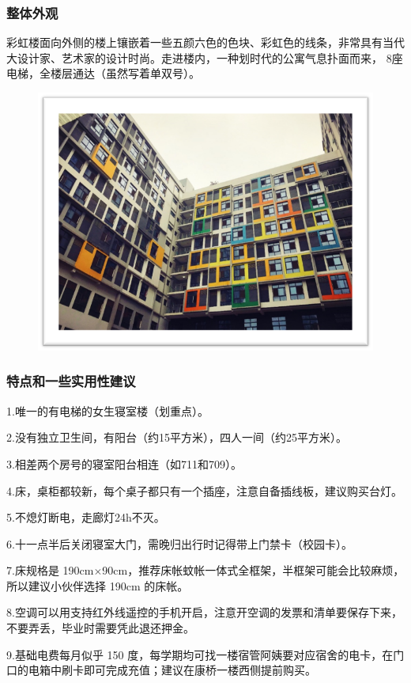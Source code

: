 \documentclass[
decoration,  %
]{qyxf-book}
\begin{document}
	\hypertarget{ux6574ux4f53ux5916ux89c2}{%
		\subsubsection{整体外观}\label{ux6574ux4f53ux5916ux89c2}}
	
	彩虹楼面向外侧的楼上镶嵌着一些五颜六色的色块、彩虹色的线条，非常具有当代大设计家、艺术家的设计时尚。走进楼内，一种划时代的公寓气息扑面而来， 8座电梯，全楼层通达（虽然写着单双号）。
	
	\begin{figure}[htbp]
		\centering
		\includegraphics[width=0.6\linewidth]{pics/chp2_rainbow_outlook}
	\end{figure}
	
	\hypertarget{ux5185ux90e8ux7ed3ux6784}{%
		\subsubsection{特点和一些实用性建议}\label{ux5185ux90e8ux7ed3ux6784}}
	
	1.唯一的有电梯的女生寝室楼（划重点）。
	
	2.没有独立卫生间，有阳台（约15平方米），四人一间（约25平方米）。
	
	3.相差两个房号的寝室阳台相连（如711和709）。
	
	4.床，桌柜都较新，每个桌子都只有一个插座，注意自备插线板，建议购买台灯。
	
	5.不熄灯断电，走廊灯24h不灭。
	
	6.十一点半后关闭寝室大门，需晚归出行时记得带上门禁卡（校园卡）。
	
	7.床规格是 190cm$\times$90cm，推荐床帐蚊帐一体式全框架，半框架可能会比较麻烦，所以建议小伙伴选择 190cm 的床帐。
	
	8.空调可以用支持红外线遥控的手机开启，注意开空调的发票和清单要保存下来，不要弄丢，毕业时需要凭此退还押金。
	
	9.基础电费每月似乎 150 度，每学期均可找一楼宿管阿姨要对应宿舍的电卡，在门口的电箱中刷卡即可完成充值；建议在康桥一楼西侧提前购买。
	
\end{document}
